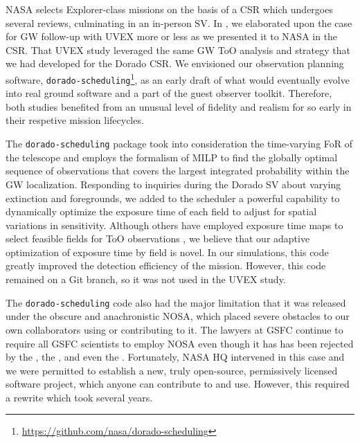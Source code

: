 \documentclass[twocolumn,times]{aastex631}
\begin{document}
NASA selects Explorer-class missions on the basis of a \acf{CSR} which undergoes several reviews, culminating in an in-person \ac{SV}. In \citet{criswell}, we elaborated upon the case for \ac{GW} follow-up with \ac{UVEX} more or less as we presented it to NASA in the \ac{CSR}. That \ac{UVEX} study leveraged the same \ac{GW} \ac{ToO} analysis and strategy that we had developed for the Dorado \ac{CSR}. We envisioned our observation planning software, \texttt{dorado-scheduling}\footnote{\url{https://github.com/nasa/dorado-scheduling}}, as an early draft of what would eventually evolve into real ground software and a part of the guest observer toolkit. Therefore, both studies benefited from an unusual level of fidelity and realism for so early in their respetive mission lifecycles.

The \texttt{dorado-scheduling} package took into consideration the time-varying \ac{FoR} of the telescope and employs the formalism of \ac{MILP} to find the globally optimal sequence of observations that covers the largest integrated probability within the \ac{GW} localization. Responding to inquiries during the Dorado \ac{SV} about varying extinction and foregrounds, we added to the scheduler a powerful capability to dynamically optimize the exposure time of each field to adjust for spatial variations in sensitivity. Although others have employed exposure time maps to select feasible fields for \ac{ToO} observations \citep{2020A&C....3300425H}, we believe that our adaptive optimization of exposure time by field is novel. In our simulations, this code greatly improved the detection efficiency of the mission. However, this code remained on a Git branch, so it was not used in the \ac{UVEX} study.

The \texttt{dorado-scheduling} code also had the major limitation that it was released under the obscure and anachronistic \ac{NOSA}, which placed severe obstacles to our own collaborators using or contributing to it. The lawyers at \ac{GSFC} continue to require all \ac{GSFC} scientists to employ \ac{NOSA} even though it has has been rejected by the \citet{FSF}, the \citet{NAP25217}, and even the \citet{SMD}. Fortunately, NASA \ac{HQ} intervened in this case and we were permitted to establish a new, truly open-source, permissively licensed software project, which anyone can contribute to and use. However, this required a rewrite which took several years.
\end{document}
